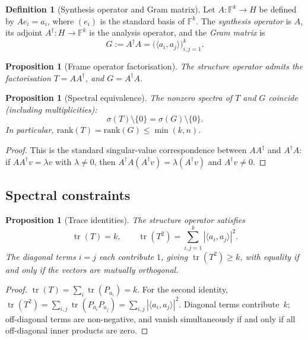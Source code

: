 \documentclass[
  twocolumn,
  aps,
  pra,
  floatfix,
  amsmath,amssymb,
  longbibliography
]{revtex4-2}
\newtheorem{proposition}[theorem]{Proposition}
\theoremstyle{definition}
\newtheorem{definition}[theorem]{Definition}
\theoremstyle{remark}
\begin{document}
\begin{definition}[Synthesis operator and Gram matrix]
Let $A\colon\mathbb{F}^k\to H$ be defined by $Ae_i=a_i$, where $(e_i)$
is the standard basis of $\mathbb{F}^k$.  The \emph{synthesis operator}
is $A$, its adjoint $A^\dagger\colon H\to\mathbb{F}^k$ is the analysis
operator, and the \emph{Gram matrix} is
\[
  G:=A^\dagger A=\bigl(\langle a_i,a_j\rangle\bigr)_{i,j=1}^k.
\]
\end{definition}

\begin{proposition}[Frame operator factorisation]\label{prop:AAstar}
The structure operator admits the factorisation $T=AA^\dagger$, and
$G=A^\dagger A$.
\end{proposition}

\begin{proposition}[Spectral equivalence]\label{prop:spectral_equivalence}
The nonzero spectra of $T$ and $G$ coincide (including
multiplicities):
\[
  \sigma(T)\setminus\{0\}=\sigma(G)\setminus\{0\}.
\]
In particular, $\mathrm{rank}(T)=\mathrm{rank}(G)\le\min(k,n)$.
\end{proposition}

\begin{proof}
This is the standard singular-value correspondence between
$AA^\dagger$ and $A^\dagger A$: if $AA^\dagger v=\lambda v$ with
$\lambda\neq 0$, then $A^\dagger A(A^\dagger v)=\lambda(A^\dagger v)$
and $A^\dagger v\neq 0$.
\end{proof}

\subsection{Spectral constraints}

\begin{proposition}[Trace identities]\label{prop:trace}
The structure operator satisfies
\[
  \operatorname{tr}(T)=k,\qquad
  \operatorname{tr}(T^2)=\sum_{i,j=1}^{k}|\langle a_i,a_j\rangle|^2.
\]
The diagonal terms $i=j$ each contribute $1$, giving
$\operatorname{tr}(T^2)\ge k$, with equality if and only if the
vectors are mutually orthogonal.
\end{proposition}

\begin{proof}
$\operatorname{tr}(T)=\sum_i\operatorname{tr}(P_{a_i})=k$.  For the
second identity,
$\operatorname{tr}(T^2)=\sum_{i,j}\operatorname{tr}(P_{a_i}P_{a_j})
=\sum_{i,j}|\langle a_i,a_j\rangle|^2$.  Diagonal terms contribute~$k$;
off-diagonal terms are non-negative, and vanish simultaneously
if and only if all off-diagonal inner products are zero.
\end{proof}
\end{document}
